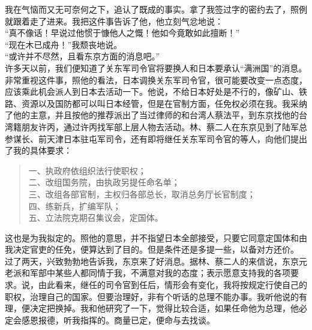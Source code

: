 我在气恼而又无可奈何之下，追认了既成的事实。拿了我签过字的密约去了，照例就跟着走了进来。我把这件事告诉了他，他立刻气忿地说：\\

“真不像话！早说过他惯于慷他人之慨！他如今竟敢如此擅断！”\\

“现在木已成舟！”我颓丧地说。\\

“或许并不尽然，且看东京方面的消息吧。”\\

许多天以前，我们便知道了关东军司令官将要换人和日本要承认“满洲国”的消息。非常重视这件事，照他的看法，日本调换关东军司令官，很可能要改变一点态度，应该乘此机会派人到日本去活动一下。他说，不给日本好处是不行的，像矿山、铁路、资源以及国防都可以叫日本经管，但是在官制方面，任免权必须在我。我采纳了他的主意，并且按他的推荐派出了当过律师的和台湾人蔡法平，到东京找他的台湾籍朋友许丙，通过许丙找军部上层人物去活动。林、蔡二人在东京见到了陆军总参谋长、前天津日本驻屯军司令，还有即将继任关东军司令官的等人，向他们提出了我的具体要求：\\

\begin{quote}
	一、执政府依组织法行使职权；\\

二、改组国务院，由执政另提任命名单；\\

三、改组各部官制，主权归各部总长，取消总务厅长官制度；\\

四、练新兵，扩编军队；\\

五、立法院克期召集议会，定国体。\\
\end{quote}

这也是为我拟定的。照他的意思，并不指望日本全部接受，只要它同意定国体和由我决定官吏的任免，便算达到了目的。但是条件还是多提一些，以备对方还价。\\

过了两天，兴致勃勃地告诉我，东京来了好消息。据林、蔡二人的来信说，东京元老派和军部中某些人都同情于我，不满意对我的态度；表示愿意支持我的各项要求。说，由此看来，继任的司令官到任后，情形会有变化，我将按规定行使自己的职权，治理自己的国家。但要治理好，非有个听话的总理不能办事。我听他说的有理，便决定把换掉。我和他研究了一下，觉得比较合适，如果任命他为总理，他必定会感恩报德，听我指挥的。商量已定，便命与去找谈。\\

